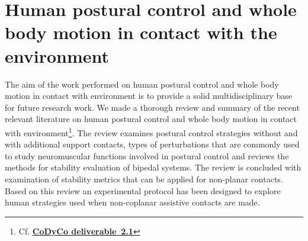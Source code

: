 \documentclass[final,5p,twocolumn]{elsarticle}
\begin{document}
\section{Human postural control and whole body motion in contact with the environment}
The aim of the work performed on human postural control and whole body motion in contact with environment is to provide a solid multidisciplinary base for future research work. We made a thorough review and summary of the recent relevant literature on human postural control and whole body motion in contact with environment\footnote{Cf. \href{https://github.com/robotology-playground/codyco-deliverables/blob/master/D2.1/pdf/D2.1.pdf?raw=true}{\textbf{\underline{CoDyCo deliverable~2.1}}}}. The review examines postural control strategies without and with additional support contacts, types of perturbations that are commonly used to study neuromuscular functions involved in postural control and reviews the methods for stability evaluation of bipedal systems. The review is concluded with examination of stability metrics that can be applied for non-planar contacts. Based on this review an experimental protocol has been designed to explore human strategies used when non-coplanar assistive contacts are made.


\end{document}
